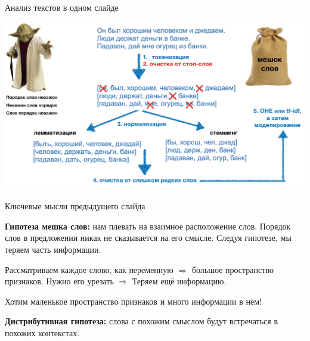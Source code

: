 \documentclass[notes,12pt, aspectratio=169]{beamer}
\newenvironment{wideitemize}{\itemize\addtolength{\itemsep}{10pt}}{\enditemize}
\begin{document}
\begin{frame}{Анализ текстов в одном слайде}
\begin{center}
	\includegraphics[width=.95\linewidth]{classic_text.png}
\end{center}
\end{frame} 

	

\begin{frame}{Ключевые мысли предыдущего слайда}
\begin{wideitemize} 
\item \textbf{Гипотеза мешка слов:} нам плевать на взаимное расположение слов. Порядок слов в предложении никак не сказывается на его смысле. 	{\color{red}  Следуя гипотезе, мы теряем часть информации.}
	
\item Рассматриваем каждое слово, как переменную $\Rightarrow$ большое пространство признаков. Нужно его урезать $\Rightarrow$ 	{\color{red}  Теряем ещё информацию.}

\item Хотим маленькое пространство признаков и много информации в нём!

\item \textbf{Дистрибутивная гипотеза:} слова с похожим смыслом будут встречаться в похожих контекстах.
\end{wideitemize}
\end{frame} 
\end{document}
